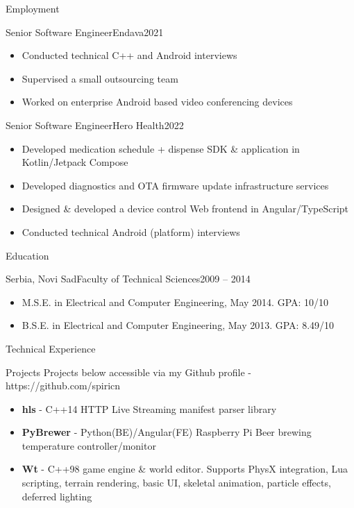 \documentclass[]{mcdowellcv}
\begin{document}
\begin{cvsection}{Employment}
		\begin{cvsubsection}{Senior Software Engineer}{Endava}{2021}
			\begin{itemize}
				\item Conducted technical C++ and Android interviews
				\item Supervised a small outsourcing team
				\item Worked on enterprise Android based video conferencing devices
			\end{itemize}
		\end{cvsubsection}

		\begin{cvsubsection}{Senior Software Engineer}{Hero Health}{2022}
			\begin{itemize}
				\item Developed medication schedule + dispense SDK \& application in Kotlin/Jetpack Compose
				\item Developed diagnostics and OTA firmware update infrastructure services
				\item Designed \& developed a device control Web frontend in Angular/TypeScript
				\item Conducted technical Android (platform) interviews
			\end{itemize}
		\end{cvsubsection}
	\end{cvsection}

	\begin{cvsection}{Education}
		\begin{cvsubsection}{Serbia, Novi Sad}{Faculty of Technical Sciences}{2009 -- 2014}
			\begin{itemize}
				\item M.S.E. in Electrical and Computer Engineering, May 2014. GPA: 10/10
				\item B.S.E. in Electrical and Computer Engineering, May 2013. GPA: 8.49/10
			\end{itemize}
		\end{cvsubsection}
	\end{cvsection}

	\begin{cvsection}{Technical Experience}
		\begin{cvsubsection}{Projects}{}{}
			Projects below accessible via my Github profile - https://github.com/spiricn
			\begin{itemize}
				\item \textbf{hls} - C++14 HTTP Live Streaming manifest parser library
				\item \textbf{PyBrewer} - Python(BE)/Angular(FE) Raspberry Pi Beer brewing temperature controller/monitor
				\item \textbf{Wt} - C++98 game engine \& world editor. Supports PhysX integration, Lua scripting, terrain rendering, basic UI, skeletal animation, particle effects, deferred lighting
			\end{itemize}
		\end{cvsubsection}
	\end{cvsection}
\end{document}
